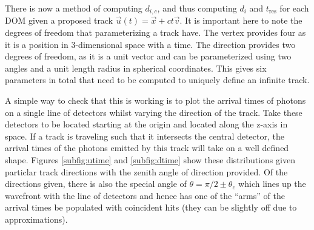 There is now a method of computing $d_{i,c}$, and thus computing $d_{i}$ and $t_{\text{res}}$ for each DOM given a proposed track $\vec{u}(t) = \vec{x} + ct\vec{v}$. It is important here to note the degrees of freedom that parameterizing a track have. The vertex provides four as it is a position in 3-dimensional space with a time. The direction provides two degrees of freedom, as it is a unit vector and can be parameterized using two angles and a unit length radius in spherical coordinates. This gives six parameters in total that need to be computed to uniquely define an infinite track.

A simple way to check that this is working is to plot the arrival times of photons on a single line of detectors whilst varying the direction of the track. Take these detectors to be located starting at the origin and located along the z-axis in space. If a track is traveling such that it intersects the central detector, the arrival times of the photons emitted by this track will take on a well defined shape. Figures \ref{subfig:utime} and \ref{subfig:dtime} show these distributions given particlar track directions with the zenith angle of direction provided. Of the directions given, there is also the special angle of $\theta = \pi/2 \pm \theta_{c}$ which lines up the wavefront with the line of detectors and hence has one of the ``arms'' of the arrival times be populated with coincident hits (they can be slightly off due to approximations). 

